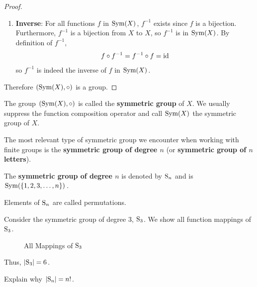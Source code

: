 \begin{proof}
\begin{enumerate}
        \item \textbf{Inverse}: For all functions $f$ in $\mathrm{Sym}(X)$, $f^{-1}$ exists since $f$ is a bijection. Furthermore, $f^{-1}$ is a bijection from $X$ to $X$, so $f^{-1}$ is in $\mathrm{Sym}(X)$. By definition of $f^{-1}$,
        \[
            f \circ f^{-1} = f^{-1} \circ f = \mathrm{id}
        \]
        so $f^{-1}$ is indeed the inverse of $f$ in $\mathrm{Sym}(X)$.
    \end{enumerate}
    Therefore $(\mathrm{Sym}(X), \circ)$ is a group.
\end{proof}

The group $(\mathrm{Sym}(X), \circ)$ is called the \textbf{symmetric group} of $X$. We usually suppress the function composition operator and call $\mathrm{Sym}(X)$ the symmetric group of $X$.

The most relevant type of symmetric group we encounter when working with finite groups is the \textbf{symmetric group of degree $n$} (or \textbf{symmetric group of $n$ letters}).
\begin{definition}
    The \textbf{symmetric group of degree $n$} is denoted by $\mathrm{S}_{n}$ and is $\mathrm{Sym}(\{1, 2, 3, \dots, n\})$.
\end{definition}
\begin{remark}
    Elements of $\mathrm{S}_{n}$ are called permutations.
\end{remark}

\newpage

\begin{example}\label{example-symmetric-group-of-degree-3}
    Consider the symmetric group of degree 3, $\mathrm{S}_{3}$. We show all function mappings of $\mathrm{S}_{3}$.

    \begin{figure}[h]
        \centering
        \caption{All Mappings of $\mathrm{S}_{3}$}
    \end{figure}

    Thus, $|\mathrm{S}_{3}| = 6$.
\end{example}
\begin{exercise}\label{exercise-order-of-Sn}
    Explain why $|\mathrm{S}_{n}| = n!$.
\end{exercise}

